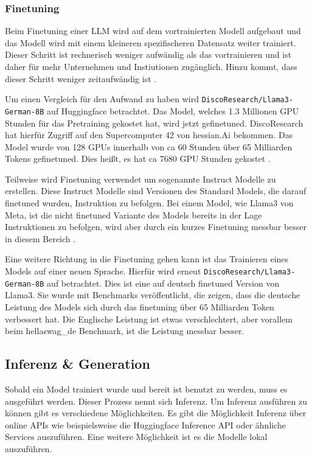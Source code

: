 \subsubsection{Finetuning}
Beim Finetuning einer LLM wird auf dem vortrainierten Modell aufgebaut und 
das Modell wird mit einem kleineren spezifischeren Datensatz weiter trainiert. 
Dieser Schritt ist rechnerisch weniger aufwändig als das vortrainieren und 
ist daher für mehr Unternehmen und Instiutionen zugänglich. Hinzu kommt, dass
dieser Schritt weniger zeitaufwändig ist \cite{dasFineTuneLarge2024}.\par
Um einen Vergleich für den Aufwand zu haben wird \verb|DiscoResearch/Llama3-German-8B|
auf Huggingface betrachtet. Das Model, welches 1.3 Millionen GPU Stunden für das 
Pretraining gekostet hat, wird jetzt gefinetuned. DiscoResearch hat hierfür Zugriff 
auf den Supercomputer 42 von hessian.Ai bekommen. Das Model wurde von 128 GPUs innerhalb 
von ca 60 Stunden über 65 Milliarden Tokens gefinetuned. Dies heißt, es hat ca 7680 GPU Stunden
gekostet \cite{DiscoResearchLlama3German8BHugging2024}.\par
Teilweise wird Finetuning verwendet um sogenannte Instruct Modelle zu erstellen.
Diese Instruct Modelle sind Versionen des Standard Models, die darauf finetuned 
wurden, Instruktion zu befolgen. Bei einem Model, wie Llama3 von Meta, ist die 
nicht finetuned Variante des Models bereits in der Lage Instruktionen zu befolgen, 
wird aber durch ein kurzes Finetuning messbar besser in diesem Bereich \cite{touvronLLaMAOpenEfficient}.\par
Eine weitere Richtung in die Finetuning gehen kann ist das Trainieren eines Models 
auf einer neuen Sprache. Hierfür wird erneut \verb|DiscoResearch/Llama3-German-8B| auf 
betrachtet. Dies ist eine auf deutsch finetuned Version von Llama3. Sie wurde mit Benchmarks 
veröffentlicht, die zeigen, dass die deutsche Leistung des Models sich durch 
das finetuning über 65 Milliarden Token verbessert hat. Die Englische Leistung ist 
etwas verschlechtert, aber vorallem beim hellaswag\_de \cite{LeoLMHellaSwagdeDatasets} 
Benchmark, ist die Leistung messbar besser.
\cite{DiscoResearchLlama3German8BHugging2024}


\subsection{Inferenz \& Generation}
\label{s:intro:llm:inf}
Sobald ein Model trainiert wurde und bereit ist benutzt zu werden, muss es ausgeführt werden. Dieser Prozess nennt sich Inferenz.
Um Inferenz ausführen zu können gibt es verschiedene Möglichkeiten. Es gibt die Möglichkeit Inferenz über 
online APIs wie beispielsweise die Huggingface Inference API \cite{ServerlessInferenceAPI} oder ähnliche Services auszuführen.
Eine weitere Möglichkeit ist es die Modelle lokal auszuführen. \par

